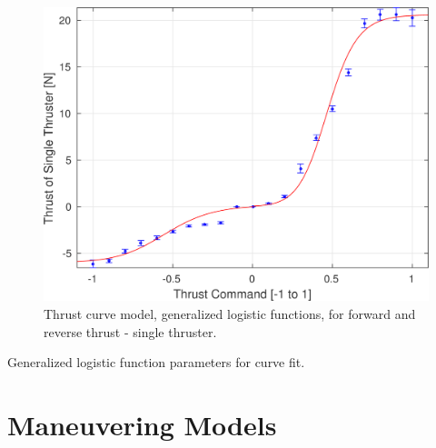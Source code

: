 \documentclass[11pt,draftcls,journal,onecolumn]{IEEEtran}
\begin{document}
\begin{figure}[htbp]
\centering
\includegraphics[width=0.7\linewidth]{tcurve_both.png}
\caption{Thrust curve model, generalized logistic functions, for forward and reverse thrust - single thruster.}
\label{f:tcurve_both}
\end{figure}


\begin{table}[hbt!] 
\renewcommand{\arraystretch}{1.2}
\caption{Generalized logistic function parameters for curve fit.}
\label{t:tcurvefit}
\centering
{}
\end{table}

\clearpage



\section{Maneuvering Models}
\end{document}
